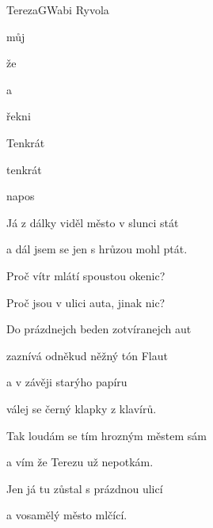 \setcounter{page}{85}
\begin{song}{Tereza}{G}{Wabi Ryvola}

\begin{SBVerse}


můj 

že 

a 

\end{SBVerse}

\begin{SBChorus}


řekni 

Tenkrát 

tenkrát 

napos

\end{SBChorus}

\begin{SBVerse}

Já z dálky viděl město v slunci stát

a dál jsem se jen s hrůzou mohl ptát.

Proč vítr mlátí spoustou okenic?

Proč jsou v ulici auta, jinak nic?

\end{SBVerse}

\begin{SBVerse}

Do prázdnejch beden zotvíranejch aut

zaznívá odněkud něžný tón Flaut

a v závěji starýho papíru

válej se černý klapky z klavírů.

\end{SBVerse}

\begin{SBVerse}

Tak loudám se tím hrozným městem sám

a vím že Terezu už nepotkám.

Jen já tu zůstal s prázdnou ulicí

a vosamělý město mlčící.

\end{SBVerse}

\end{song}

\pagebreak
